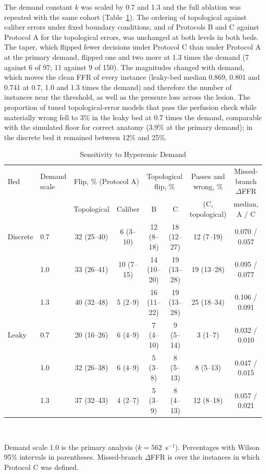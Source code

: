 The demand constant $k$ was scaled by 0.7 and 1.3 and the full ablation was repeated with the same cohort
(Table~\ref{tab:demand}). The ordering of topological against caliber errors under fixed boundary conditions, and of
Protocols B and C against Protocol A for the topological errors, was unchanged at both levels in both beds. The taper,
which flipped fewer decisions under Protocol C than under Protocol A at the primary demand, flipped one and two more
at 1.3 times the demand (7 against 6 of 97; 11 against 9 of 150). The magnitudes changed with demand, which moves the
clean FFR of every instance (leaky-bed median 0.869, 0.801 and 0.741 at 0.7, 1.0 and 1.3 times the demand) and
therefore the number of instances near the threshold, as well as the pressure loss across the lesion. The proportion
of tuned topological-error models that pass the perfusion check while materially wrong fell to 3\% in the leaky bed
at 0.7 times the demand, comparable with the simulated floor for correct anatomy (3.9\% at the primary demand); in
the discrete bed it remained between 12\% and 25\%.
\begin{table}[!h]
\caption{Sensitivity to Hyperemic Demand}\label{tab:demand}
\centering\small
\begin{tabular}{@{}llcccccc@{}}
\toprule
Bed & Demand scale & \multicolumn{2}{c}{Flip, \% (Protocol A)} & \multicolumn{2}{c}{Topological flip, \%} &
Passes and wrong, \% & Missed-branch $\Delta$FFR\\
\cmidrule(lr){3-4}\cmidrule(lr){5-6}
 & & Topological & Caliber & B & C & (C, topological) & median, A / C\\
\midrule
Discrete & 0.7 & 32 (25--40) & 6 (3--10) & 12 (8--18) & 18 (12--27) & 12 (7--19) & 0.070 / 0.057 \\
 & 1.0 & 33 (26--41) & 10 (7--15) & 14 (10--20) & 19 (13--28) & 19 (13--28) & 0.095 / 0.077 \\
 & 1.3 & 40 (32--48) & 5 (2--9) & 16 (11--22) & 19 (13--28) & 25 (18--34) & 0.106 / 0.091 \\
Leaky & 0.7 & 20 (16--26) & 6 (4--9) & 7 (4--10) & 9 (5--14) & 3 (1--7) & 0.032 / 0.010 \\
 & 1.0 & 32 (26--38) & 6 (4--9) & 5 (3--8) & 8 (5--13) & 8 (5--13) & 0.047 / 0.015 \\
 & 1.3 & 37 (32--43) & 4 (2--7) & 5 (3--9) & 8 (4--13) & 12 (8--18) & 0.057 / 0.021 \\
\bottomrule
\end{tabular}
\\[3pt]
\parbox{0.9\textwidth}{\footnotesize Demand scale 1.0 is the primary analysis ($k = 562$~s$^{-1}$). Percentages with Wilson 95\%
intervals in parentheses. Missed-branch $\Delta$FFR is over the instances in which Protocol C was defined.}
\end{table}
